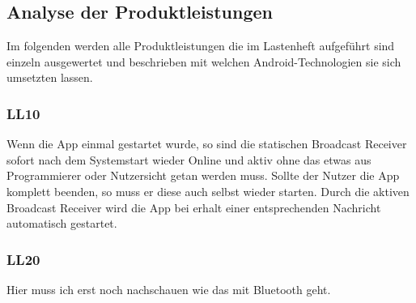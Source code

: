 \subsection{Analyse der Produktleistungen}
Im folgenden werden alle Produktleistungen die im Lastenheft aufgef\"uhrt sind einzeln ausgewertet und beschrieben mit welchen Android-Technologien sie sich umsetzten lassen.

\subsubsection{LL10}
Wenn die App einmal gestartet wurde, so sind die statischen Broadcast Receiver sofort nach dem Systemstart wieder Online und aktiv ohne das etwas aus Programmierer oder Nutzersicht getan werden muss. Sollte der Nutzer die App komplett beenden, so muss er diese auch selbst wieder starten.
Durch die aktiven Broadcast Receiver wird die App bei erhalt einer entsprechenden Nachricht automatisch gestartet.

\subsubsection{LL20}
{\color{red}Hier muss ich erst noch nachschauen wie das mit Bluetooth geht.}